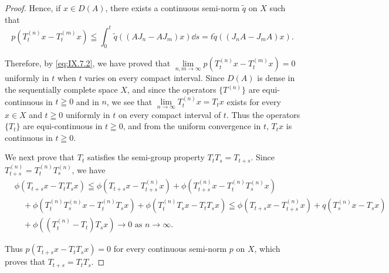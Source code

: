 \begin{proof}
Hence, if $x \in D(A)$, there exists a continuous semi-norm $\tilde{q}$ on $X$ such that 
\[
p \left(T _{t} ^{(n)} x - T _{t} ^{(m)} x\right) \leqq \int_{0} ^{t} \tilde {q} \left(\left(A J _{n} - A J _{m}\right) x\right) \dd s = t \tilde {q} \left(\left(J _{n} A - J _{m} A\right) x\right).
\]

Therefore, by \eqref{eq:IX.7.2}, we have proved that $\lim\limits_{n,m\to \infty}p(T_t^{(n)}x - T_t^{(m)}x) = 0$ uniformly in $t$ when $t$ varies on every compact interval. Since $D(A)$ is dense in the sequentially complete space $X$, and since the operators $\{T^{(n)}\}$ are equi-continuous in $t\geqq 0$ and in $n$, we see that $\lim\limits_{n\to \infty}T_t^{(n)}x = T_tx$ exists for every $x\in X$ and $t\geqq 0$ uniformly in $t$ on every compact interval of $t$. Thus the operators $\{T_t\}$ are equi-continuous in $t\geqq 0$, and from the uniform convergence in $t$, $T_tx$ is continuous in $t\geqq 0$. 

We next prove that $T_{t}$ satisfies the semi-group property $T_{t}T_{s} = T_{t+s}$. Since $T_{t+s}^{(n)} = T_{t}^{(n)}T_{s}^{(n)}$, we have 
\[
\begin{aligned}
&\phi (T _{t+s} x - T _{t} T _{s} x)\leqq \phi (T _{t+s} x - T _{t+s} ^{(n)} x) + \phi (T _{t+s} ^{(n)} x - T _{t} ^{(n)} T _{s} ^{(n)} x) \\
&\quad + \phi (T _{t} ^{(n)} T _{s} ^{(n)} x - T _{t} ^{(n)} T _{s} x) + \phi (T _{t} ^{(n)} T _{s} x - T _{t} T _{s} x) \leqq \phi (T _{t+s} x - T _{t+s} ^{(n)} x) + q (T _{s} ^{(n)} x - T _{s} x) \\
&\quad + \phi ((T _{t} ^{(n)} - T _{t}) T _{s} x) \rightarrow 0 \text{ as } n \rightarrow \infty .
\end{aligned}
\]

Thus $p(T_{t+s}x - T_tT_s x) = 0$ for every continuous semi-norm $p$ on $X$, which proves that $T_{t+s} = T_tT_s$. 


\end{proof}
